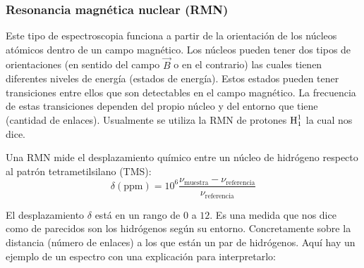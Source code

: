 \documentclass[arial,a4paper,print]{article}
\begin{document}
\subsubsection{Resonancia magnética nuclear (RMN)}

Este tipo de espectroscopia funciona a partir de la orientación de los núcleos atómicos dentro de un campo magnético. Los núcleos pueden tener dos tipos de orientaciones (en sentido del campo $\vec{B}$ o en el contrario) las cuales tienen diferentes niveles de energía (estados de energía). Estos estados pueden tener transiciones entre ellos que son detectables en el campo magnético. La frecuencia de estas transiciones dependen del propio núcleo y del entorno que tiene (cantidad de enlaces). Usualmente se utiliza la RMN de protones $ \ce{H^{1}_{1}} $ la cual nos dice. 

Una RMN mide el desplazamiento químico entre un núcleo de hidrógeno respecto al patrón tetrametilsilano (TMS): 
\begin{equation*}
	\delta(\text{ppm}) = 10^{6}\frac{\nu_{\text{muestra}} - \nu_{\text{referencia}} }{\nu_{\text{referencia}} }
\end{equation*}

El desplazamiento $\delta$ está en un rango de $0$ a $12$. Es una medida que nos dice como de parecidos son los hidrógenos según su entorno. Concretamente sobre la distancia (número de enlaces) a los que están un par de hidrógenos. Aquí hay un ejemplo de un espectro con una explicación para interpretarlo:


	
	
\end{document}
